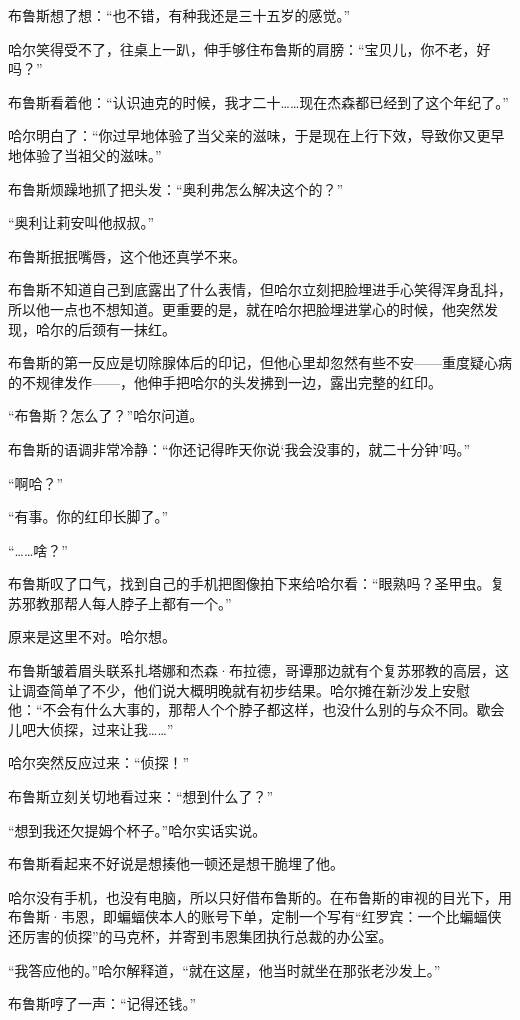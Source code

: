 \documentclass[../main]{subfiles}
\begin{document}
布鲁斯想了想：“也不错，有种我还是三十五岁的感觉。”

哈尔笑得受不了，往桌上一趴，伸手够住布鲁斯的肩膀：“宝贝儿，你不老，好吗？”

布鲁斯看着他：“认识迪克的时候，我才二十……现在杰森都已经到了这个年纪了。”

哈尔明白了：“你过早地体验了当父亲的滋味，于是现在上行下效，导致你又更早地体验了当祖父的滋味。”

布鲁斯烦躁地抓了把头发：“奥利弗怎么解决这个的？”

“奥利让莉安叫他叔叔。”

布鲁斯抿抿嘴唇，这个他还真学不来。

布鲁斯不知道自己到底露出了什么表情，但哈尔立刻把脸埋进手心笑得浑身乱抖，所以他一点也不想知道。更重要的是，就在哈尔把脸埋进掌心的时候，他突然发现，哈尔的后颈有一抹红。

布鲁斯的第一反应是切除腺体后的印记，但他心里却忽然有些不安——重度疑心病的不规律发作——，他伸手把哈尔的头发拂到一边，露出完整的红印。

“布鲁斯？怎么了？”哈尔问道。

布鲁斯的语调非常冷静：“你还记得昨天你说`我会没事的，就二十分钟'吗。”

“啊哈？”

“有事。你的红印长脚了。”

“……啥？”

布鲁斯叹了口气，找到自己的手机把图像拍下来给哈尔看：“眼熟吗？圣甲虫。复苏邪教那帮人每人脖子上都有一个。”

原来是这里不对。哈尔想。

布鲁斯皱着眉头联系扎塔娜和杰森·布拉德，哥谭那边就有个复苏邪教的高层，这让调查简单了不少，他们说大概明晚就有初步结果。哈尔摊在新沙发上安慰他：“不会有什么大事的，那帮人个个脖子都这样，也没什么别的与众不同。歇会儿吧大侦探，过来让我\ldots\ldots”

哈尔突然反应过来：“侦探！”

布鲁斯立刻关切地看过来：“想到什么了？”

“想到我还欠提姆个杯子。”哈尔实话实说。

布鲁斯看起来不好说是想揍他一顿还是想干脆埋了他。

哈尔没有手机，也没有电脑，所以只好借布鲁斯的。在布鲁斯的审视的目光下，用布鲁斯·韦恩，即蝙蝠侠本人的账号下单，定制一个写有“红罗宾：一个比蝙蝠侠还厉害的侦探”的马克杯，并寄到韦恩集团执行总裁的办公室。

“我答应他的。”哈尔解释道，“就在这屋，他当时就坐在那张老沙发上。”

布鲁斯哼了一声：“记得还钱。”
\end{document}
